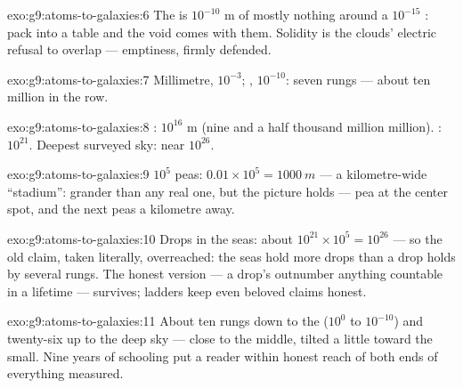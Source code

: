 \begin{solution}{exo:g9:atoms-to-galaxies:6}
The  is $10^{-10}$ \unit{m} of mostly nothing around a
$10^{-15}$ : pack  into a table and the void
comes with them. Solidity is the  clouds' electric
refusal to overlap --- emptiness, firmly defended.
\end{solution}

\begin{solution}{exo:g9:atoms-to-galaxies:7}
Millimetre, $10^{-3}$; , $10^{-10}$: seven rungs ---
about ten million  in the row.
\end{solution}

\begin{solution}{exo:g9:atoms-to-galaxies:8}
: $10^{16}$ \unit{m} (nine and a half thousand
million million). : $10^{21}$. Deepest surveyed
sky: near $10^{26}$.
\end{solution}

\begin{solution}{exo:g9:atoms-to-galaxies:9}
$10^{5}$ peas: $0.01 \times 10^{5} = \qty{1000}{m}$ --- a
kilometre-wide ``stadium'': grander than any real one, but
the picture holds --- pea at the center spot, and the next
peas a kilometre away.
\end{solution}

\begin{solution}{exo:g9:atoms-to-galaxies:10}
Drops in the seas: about $10^{21} \times 10^{5} = 10^{26}$
--- so the old claim, taken literally, overreached: the seas
hold more drops than a drop holds  by several
rungs. The honest version --- a drop's  outnumber
anything countable in a lifetime --- survives; ladders keep
even beloved claims honest.
\end{solution}

\begin{solution}{exo:g9:atoms-to-galaxies:11}
About ten rungs down to the  ($10^{0}$ to $10^{-10}$)
and twenty-six up to the deep sky --- close to the middle,
tilted a little toward the small. Nine years of schooling
put a reader within honest reach of both ends of everything
measured.
\end{solution}

